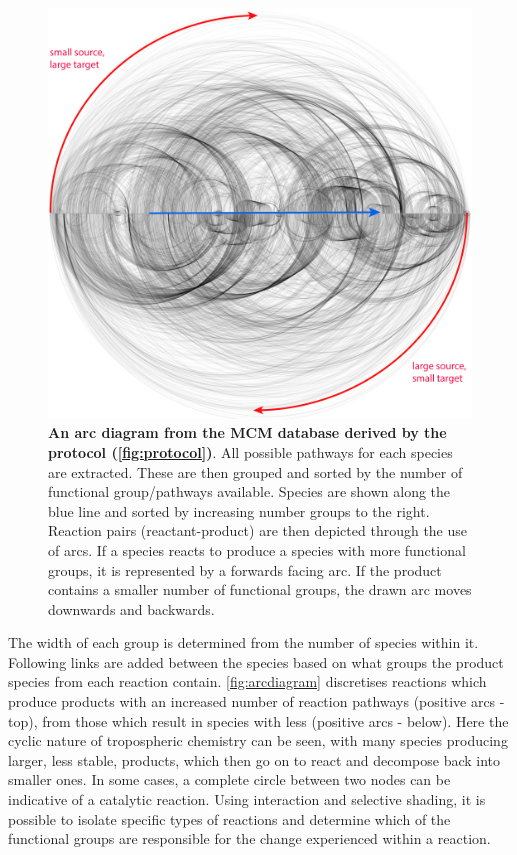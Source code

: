 \begin{figure}[H]
     \centering
     \includegraphics[width=.8\textwidth]{figures_c1/arc/arc_all.png}
     \caption{\textbf{An arc diagram from the MCM database derived by the protocol (\autoref{fig:protocol})}. All possible pathways for each species are extracted. These are then grouped and sorted by the number of functional group/pathways available. Species are shown along the blue line and sorted by increasing number groups to the right. Reaction pairs (reactant-product) are then depicted through the use of arcs. If a species reacts to produce a species with more functional groups, it is represented by a forwards facing arc. If the product contains a smaller number of functional groups, the drawn arc moves downwards and backwards.}
     \label{fig:arcdiagram}
\end{figure}

The width of each group is determined from the number of species within it. Following links are added between the species based on what groups the product species from each reaction contain. \autoref{fig:arcdiagram} discretises reactions which produce products with an increased number of reaction pathways (positive arcs - top), from those which result in species with less (positive arcs - below). Here the cyclic nature of tropospheric chemistry can be seen, with many species producing larger, less stable, products, which then go on to react and decompose back into smaller ones. In some cases, a complete circle between two nodes can be indicative of a catalytic reaction.  Using interaction and selective shading, it is possible to isolate specific types of reactions and determine which of the functional groups are responsible for the change experienced within a reaction.

